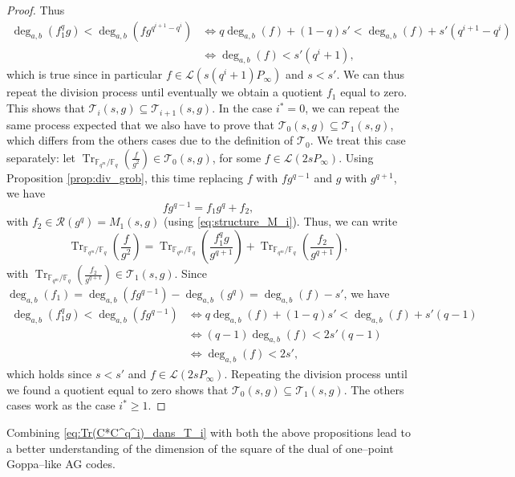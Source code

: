 \documentclass[a4paper]{article}
\theoremstyle{definition}
\theoremstyle{remark}
\newcommand{\calL}{\mathcal{L}}
\newcommand{\calR}{\mathcal{R}}
\newcommand{\calT}{\mathcal{T}}
\newcommand{\fq}{\mathbb{F}_{q}}
\newcommand{\Tr}[1]{\operatorname{Tr}_{\mathbb{F}_{q^m}/\fq}\left(#1\right)}
\newcommand{\degab}[1]{\deg_{a,b}\left(#1\right)}
\begin{document}
\begin{proof}
Thus
\begin{align*}
     \degab{f_1^qg} < \degab{fg^{q^{i+1}-q^i}} & \iff q\degab{f} +(1-q)s' < \degab{f} +s'(q^{i+1}-q^i) \\
                                               & \iff \degab{f} < s'(q^{i}+1),
\end{align*}
which is true since in particular $f \in \calL(s(q^i+1)P_\infty)$ and $s<s'$. We can thus repeat the division process until eventually we obtain a quotient $f_1$ equal to zero. This shows that $\calT_i(s,g) \subseteq \calT_{i+1}(s,g)$.
In the case $i^*=0$, we can repeat the same process expected that we also have to prove that $\calT_0(s,g) \subseteq \calT_1(s,g)$, which differs from the others cases due to the definition of $\calT_0$. We treat this case separately: let $\Tr{\frac{f}{g^2}} \in \calT_0(s,g)$, for some $f \in \calL(2sP_\infty)$. Using Proposition \ref{prop:div_grob}, this time replacing $f$ with $fg^{q-1}$ and $g$ with $g^{q+1}$, we have
$$fg^{q-1} = f_1g^q + f_2,$$ with $f_2 \in \calR(g^q) = M_1(s,g)$ (using \eqref{eq:structure_M_i}).
Thus, we can write
    $$ \Tr{\frac{f}{g^2}} = \Tr{\frac{f_1^qg}{g^{q+1}}}  + \Tr{\frac{f_2}{g^{q+1}}}, $$
with $\Tr{\frac{f_2}{g^{q+1}}} \in \calT_1(s,g)$. Since $\degab{f_1} = \degab{fg^{q-1}} - \degab{g^q} = \degab{f}-s'$, we have 
\begin{align*}
     \degab{f_1^qg} < \degab{fg^{q-1}} & \iff q\degab{f} +(1-q)s' < \degab{f} + s'(q-1)\\
                                               & \iff (q-1)\degab{f} < 2s'(q-1)\\
                                               & \iff \degab{f} < 2s',
\end{align*}
which holds since $s<s'$ and $f \in \calL(2sP_\infty)$. Repeating the division process until we found a quotient equal to zero shows that $\calT_0(s,g) \subseteq \calT_1(s,g)$. The others cases work as the case $i^* \geq 1$.
\end{proof}
Combining \eqref{eq:Tr(C*C^q^i)_dans_T_i} with both the above propositions lead to a better understanding of the dimension of the square of the dual of one--point Goppa--like AG codes. 
\end{document}
